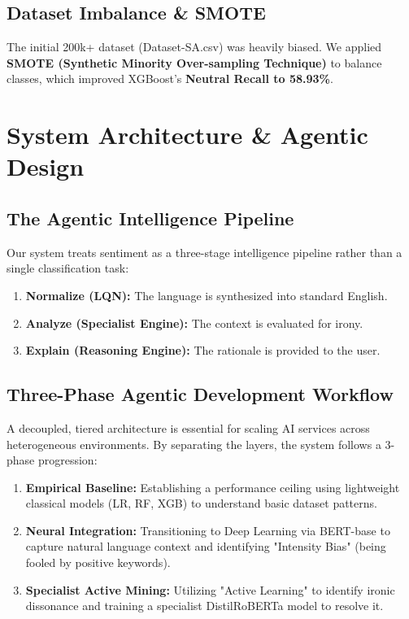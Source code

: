 \documentclass[11pt,oneside]{scrbook}
\begin{document}
\section{Dataset Imbalance \& SMOTE}
The initial 200k+ dataset (Dataset-SA.csv) was heavily biased. We applied \textbf{SMOTE (Synthetic Minority Over-sampling Technique)} to balance classes, which improved XGBoost's \textbf{Neutral Recall to 58.93\%}.

\chapter{System Architecture \& Agentic Design}

\section{The Agentic Intelligence Pipeline}
Our system treats sentiment as a three-stage intelligence pipeline rather than a single classification task:
\begin{enumerate}
    \item \textbf{Normalize (LQN):} The language is synthesized into standard English.
    \item \textbf{Analyze (Specialist Engine):} The context is evaluated for irony.
    \item \textbf{Explain (Reasoning Engine):} The rationale is provided to the user.
\end{enumerate}

\section{Three-Phase Agentic Development Workflow}
A decoupled, tiered architecture is essential for scaling AI services across heterogeneous environments. By separating the layers, the system follows a 3-phase progression:
\begin{enumerate}
    \item \textbf{Empirical Baseline:} Establishing a performance ceiling using lightweight classical models (LR, RF, XGB) to understand basic dataset patterns.
    \item \textbf{Neural Integration:} Transitioning to Deep Learning via BERT-base to capture natural language context and identifying "Intensity Bias" (being fooled by positive keywords).
    \item \textbf{Specialist Active Mining:} Utilizing "Active Learning" to identify ironic dissonance and training a specialist DistilRoBERTa model to resolve it.
\end{enumerate}
\end{document}
